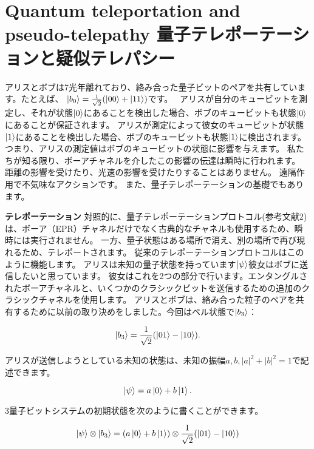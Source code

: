 \section{Quantum teleportation and pseudo-telepathy 量子テレポーテーションと疑似テレパシー}

アリスとボブは7光年離れており、絡み合った量子ビットのペアを共有しています。たとえば、
$ \ket{b_0} = \frac{1}{\sqrt{2}} ( \ket{00} + \ket{11})$です。　
アリスが自分のキュービットを測定し、それが状態$\ket{0}$にあることを検出した場合、ボブのキュービットも状態$\ket{0}$にあることが保証されます。 アリスが測定によって彼女のキュービットが状態$\ket{1}$にあることを検出した場合、ボブのキュービットも状態$\ket{1}$に検出されます。 つまり、アリスの測定値はボブのキュービットの状態に影響を与えます。 私たちが知る限り、ボーアチャネルを介したこの影響の伝達は瞬時に行われます。 距離の影響を受けたり、光速の影響を受けたりすることはありません。 遠隔作用で不気味なアクションです。 また、量子テレポーテーションの基礎でもあります。

\textbf{テレポーテーション}
対照的に、量子テレポーテーションプロトコル(参考文献2)は、ボーア（EPR）チャネルだけでなく古典的なチャネルも使用するため、瞬時には実行されません。
一方、量子状態はある場所で消え、別の場所で再び現れるため、テレポートされます。 従来のテレポーテーションプロトコルはこのように機能します。
アリスは未知の量子状態を持っています$\ket{\psi}$彼女はボブに送信したいと思っています。 彼女はこれを2つの部分で行います。エンタングルされたボーアチャネルと、いくつかのクラシックビットを送信するための追加のクラシックチャネルを使用します。
アリスとボブは、絡み合った粒子のペアを共有するために以前の取り決めをしました。今回はベル状態で$\ket{b_3}$：

\begin{equation}
\label{181}
\ket{b_3} = \frac{1}{\sqrt{2}}(\ket{01}-\ket{10}).
\end{equation}

アリスが送信しようとしている未知の状態は、未知の振幅$a, b, |a|^2 + |b|^2 = 1$で記述できます。

\begin{equation}
\label{182}
\ket{\psi} = a \ket{0} + b \ket{1}.
\end{equation}

3量子ビットシステムの初期状態を次のように書くことができます。


\begin{equation}
\label{183}
\ket{\psi} \otimes \ket{b_3} = ( a \ket{0} + b \ket{1}) \otimes \frac{1}{\sqrt{2}}(\ket{01}-\ket{10})
\end{equation}

